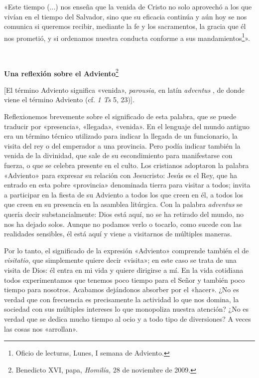 \documentclass[]{article}
\begin{document}
«Este tiempo (...) nos enseña que la venida de Cristo no solo aprovechó
a los que vivían en el tiempo del Salvador, sino que su eficacia
continúa y aún hoy se nos comunica si queremos recibir, mediante la fe y
los sacramentos, la gracia que él nos prometió, y si ordenamos nuestra
conducta conforme a sus mandamientos\footnote{Oficio de lecturas, Lunes,
  I semana de Adviento.}».

\textbf{\\
}

\textbf{Una reflexión sobre el Adviento}\footnote{Benedicto XVI, papa,
  \emph{Homilía,} 28 de noviembre de 2009.}

{[}El término Adviento significa «venida», \emph{parousia,} en latín
\emph{adventus} , de donde viene el término Adviento (cf. \emph{1 Ts} 5,
23){]}.

Reflexionemos brevemente sobre el significado de esta palabra, que se
puede traducir por «presencia», «llegada», «venida». En el lenguaje del
mundo antiguo era un término técnico utilizado para indicar la llegada
de un funcionario, la visita del rey o del emperador a una provincia.
Pero podía indicar también la venida de la divinidad, que sale de su
escondimiento para manifestarse con fuerza, o que se celebra presente en
el culto. Los cristianos adoptaron la palabra «Adviento» para expresar
su relación con Jesucristo: Jesús es el Rey, que ha entrado en esta
pobre «provincia» denominada tierra para visitar a todos; invita a
participar en la fiesta de su Adviento a todos los que creen en él, a
todos los que creen en su presencia en la asamblea litúrgica. Con la
palabra \emph{adventus} se quería decir substancialmente: Dios está
aquí, no se ha retirado del mundo, no nos ha dejado solos. Aunque no
podamos verlo o tocarlo, como sucede con las realidades sensibles, él
está aquí y viene a visitarnos de múltiples maneras.

Por lo tanto, el significado de la expresión «Adviento» comprende
también el de \emph{visitatio}, que simplemente quiere decir «visita»;
en este caso se trata de una visita de Dios: él entra en mi vida y
quiere dirigirse a mí. En la vida cotidiana todos experimentamos que
tenemos poco tiempo para el Señor y también poco tiempo para nosotros.
Acabamos dejándonos absorber por el «hacer». ¿No es verdad que con
frecuencia es precisamente la actividad lo que nos domina, la sociedad
con sus múltiples intereses lo que monopoliza nuestra atención? ¿No es
verdad que se dedica mucho tiempo al ocio y a todo tipo de diversiones?
A veces las cosas nos «arrollan».
\end{document}
